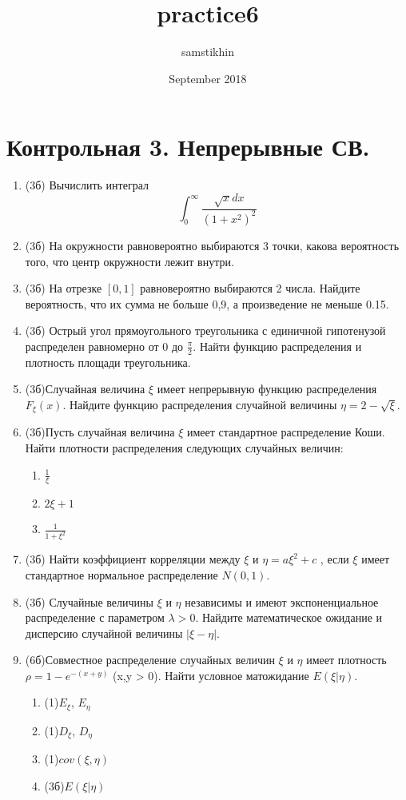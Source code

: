 \documentclass[a4paper, 14pt]{extarticle}
\title{practice6}
\author{samstikhin}
\date{September 2018}
\begin{document}
\section*{Контрольная 3. Непрерывные СВ.}
\begin{enumerate}
\item (3б) Вычислить интеграл
$$\int_0^{\infty} \frac{\sqrt{x}dx}{(1+x^2)^2}$$
\item (3б) На окружности равновероятно выбираются 3 точки, какова вероятность того, что центр окружности лежит внутри.
\item (3б) На отрезке $[0,1]$ равновероятно выбираются 2 числа. Найдите вероятность, что их сумма не больше 0,9, а произведение не меньше 0.15.
\item (3б) Острый угол прямоугольного треугольника с единичной гипотенузой распределен равномерно от 0 до $\frac{\pi}{2}$. 
Найти функцию распределения и плотность площади треугольника.
\item (3б)Случайная величина $\xi$ имеет непрерывную функцию распределения $F_{\xi}(x)$. 
Найдите функцию распределения случайной величины $\eta=2-\sqrt{\xi}$.
\item (3б)Пусть случайная величина $\xi$ имеет стандартное распределение
Коши. Найти плотности распределения следующих случайных величин:
\begin{enumerate}
\item $\frac{1}{\xi}$
\item $2\xi + 1$
\item $\frac{1}{1+\xi^2}$
\end{enumerate}
\item (3б) Найти коэффициент корреляции между $\xi$ и $\eta = a\xi^2 + c$ , если 
$\xi$ имеет стандартное нормальное распределение $N(0,1)$.
\item (3б) Случайные величины $\xi$ и $\eta$
независимы и имеют экспоненциальное распределение с параметром
$\lambda>0$. Найдите математическое ожидание и дисперсию случайной величины
$|\xi - \eta|$.


\item (6б)Совместное распределение случайных величин $\xi$ и $\eta$ имеет плотность $\rho = 1-e^{-(x+y)}$ (x,y > 0). 
Найти условное матожидание $E(\xi|\eta)$.
\begin{enumerate}
\item (1)$E_{\xi}$, $E_{\eta}$
\item (1)$D_{\xi}$, $D_{\eta}$
\item (1)$cov(\xi,\eta)$
\item (3б)$E(\xi|\eta)$
\end{enumerate}




\end{enumerate}
\end{document}
